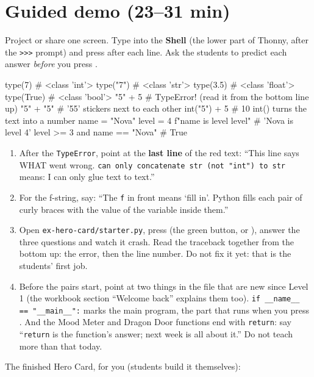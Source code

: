 \section{Guided demo (23--31 min)}
Project or share one screen. Type into the \textbf{Shell} (the lower part of Thonny, after the \texttt{>>>} prompt) and press  after each line.
Ask the students to predict each answer \emph{before} you press .

\begin{workedexample}
\begin{pycode}
type(7)              # <class 'int'>
type("7")            # <class 'str'>
type(3.5)            # <class 'float'>
type(True)           # <class 'bool'>
"5" + 5              # TypeError! (read it from the bottom line up)
"5" + "5"            # '55'  stickers next to each other
int("5") + 5         # 10    int() turns the text into a number
name = "Nova"
level = 4
f"{name} is level {level}"     # 'Nova is level 4'
level >= 3 and name == "Nova"  # True
\end{pycode}
\begin{enumerate}[leftmargin=1.4em]
  \item After the \texttt{TypeError}, point at the \textbf{last line} of the red text: \enquote{This line says WHAT went wrong.
        \texttt{can only concatenate str (not "int") to str} means: I can only glue text to text.}
  \item For the f-string, say: \enquote{The \texttt{f} in front means \enquote{fill in}. Python fills each pair of curly braces
        with the value of the variable inside them.}
  \item Open \texttt{ex-hero-card/starter.py}, press  (the green button, or ), answer the three questions and
        watch it crash. Read the traceback together from the bottom up: the error, then the line number. Do not fix it yet:
        that is the students' first job.
  \item Before the pairs start, point at two things in the file that are new since Level 1 (the workbook section
        \enquote{Welcome back} explains them too). \texttt{if \_\_name\_\_ == "\_\_main\_\_":} marks the main program, the part
        that runs when you press . And the Mood Meter and Dragon Door functions end with \texttt{return}: say
        \enquote{\texttt{return} is the function's answer; next week is all about it.} Do not teach more than that today.
\end{enumerate}
\end{workedexample}
The finished Hero Card, for you (students build it themselves):

